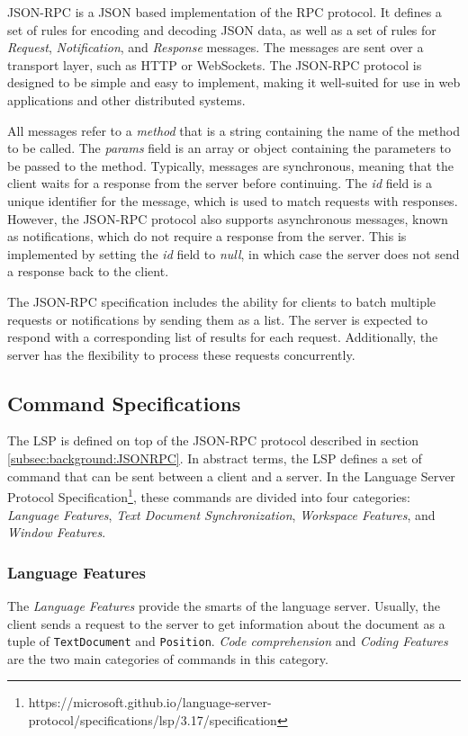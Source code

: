 JSON-RPC is a JSON based implementation of the RPC protocol. It defines a set of rules for encoding and decoding JSON data, as well as a set of rules for \textit{Request}, \textit{Notification}, and \textit{Response} messages. The messages are sent over a transport layer, such as HTTP or WebSockets. The JSON-RPC protocol is designed to be simple and easy to implement, making it well-suited for use in web applications and other distributed systems.

All messages refer to a \textit{method} that is a string containing the name of the method to be called. The \textit{params} field is an array or object containing the parameters to be passed to the method. Typically, messages are synchronous, meaning that the client waits for a response from the server before continuing. The \textit{id} field is a unique identifier for the message, which is used to match requests with responses. However, the JSON-RPC protocol also supports asynchronous messages, known as notifications, which do not require a response from the server. This is implemented by setting the \textit{id} field to \textit{null}, in which case the server does not send a response back to the client.

The JSON-RPC specification includes the ability for clients to batch multiple requests or notifications by sending them as a list. The server is expected to respond with a corresponding list of results for each request. Additionally, the server has the flexibility to process these requests concurrently.

\subsection{Command Specifications}\label{subsec:background:CommandSpecifications}
The LSP is defined on top of the JSON-RPC protocol described in section \ref{subsec:background:JSONRPC}. In abstract terms, the LSP defines a set of command that can be sent between a client and a server. In the Language Server Protocol Specification\footnote{https://microsoft.github.io/language-server-protocol/specifications/lsp/3.17/specification}, these commands are divided into four categories: \textit{Language Features}, \textit{Text Document Synchronization}, \textit{Workspace Features}, and \textit{Window Features}.

\subsubsection{Language Features}\label{subsec:background:LanguageFeatures}
The \textit{Language Features} provide the smarts of the language server. Usually, the client sends a request to the server to get information about the document as a tuple of \texttt{TextDocument} and \texttt{Position}. \textit{Code comprehension} and \textit{Coding Features} are the two main categories of commands in this category.

